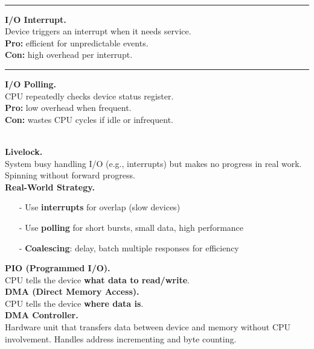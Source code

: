 \documentclass[8pt]{extarticle}
\begin{document}
\begin{minipage}[t]{0.5\textwidth}
\begin{minipage}[t]{0.48\textwidth}
\begin{enumerate}[noitemsep,topsep=0pt]
\end{enumerate}
\end{minipage}\\[3px]
\hrule
\vspace{3px}
\begin{minipage}[t]{0.48\textwidth}
\noindent\textbf{I/O Interrupt.} \\
Device triggers an interrupt when it needs service. \\ 
\textbf{Pro:} efficient for unpredictable events.  \\
\textbf{Con:} high overhead per interrupt.\\
\vspace{-7.3px}
\hrule
\end{minipage}
\hfill
\begin{minipage}[t]{0.48\textwidth}
\noindent\textbf{I/O Polling.} \\
CPU repeatedly checks device status register.  \\
\textbf{Pro:} low overhead when frequent.  \\
\textbf{Con:} wastes CPU cycles if idle or infrequent.\\[2px]
\end{minipage}\\[-13px]
\noindent\textbf{Livelock.} \\
System busy handling I/O (e.g., interrupts) but makes no progress in real work. Spinning without forward progress.\\
\noindent\textbf{Real-World Strategy.}
\begin{itemize}[noitemsep,topsep=0pt]
    \item[-] Use \textbf{interrupts} for overlap (slow devices)
    \item[-] Use \textbf{polling} for short bursts, small data, high performance
    \item[-] \textbf{Coalescing}: delay, batch multiple responses for efficiency
\end{itemize}
\noindent\textbf{PIO (Programmed I/O).} \\
CPU tells the device \textbf{what data to read/write}.\\
\noindent\textbf{DMA (Direct Memory Access).} \\
CPU tells the device \textbf{where data is}.\\
\noindent\textbf{DMA Controller.} \\
Hardware unit that transfers data between device and memory without CPU involvement. Handles address incrementing and byte counting.\\

\end{minipage}
\end{document}
